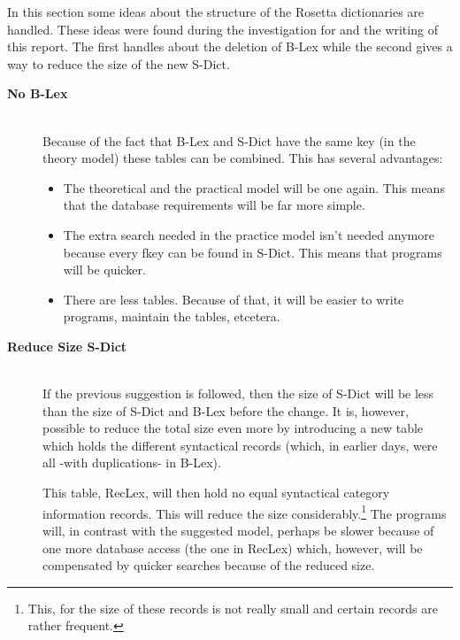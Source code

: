 In this section some ideas about the structure of the Rosetta dictionaries 
are handled. These ideas were found during the investigation for and the writing
of this report. The first handles about the deletion of B-Lex while the second 
gives a way to reduce the size of the new S-Dict.

\begin{description}
  \item [{\bf No B-Lex}]\hspace{1cm}\\
        Because of the fact that B-Lex and S-Dict have the same key (in the
        theory model) these tables can be combined. This has several advantages:

        \begin{itemize}
            \item The theoretical and the practical model will be one again.
                  This means that the database requirements will be far more 
                  simple.
            \item The extra search needed in the practice model isn't needed 
                  anymore because every fkey can be found in S-Dict. This
                  means that programs will be quicker.
            \item There are less tables. Because of that, it will be easier to
                  write programs, maintain the tables, etcetera.
        \end{itemize}

  \item [{\bf Reduce Size S-Dict}]\hspace{1cm}\\
        If the previous suggestion is followed, then the size of S-Dict will
        be less than the size of S-Dict and B-Lex before the change. It is,
        however, possible to reduce the total size even more by introducing
        a new table which holds the different syntactical records (which, in
        earlier days, were all -with duplications- in B-Lex). 

        This table, RecLex, will then hold no
        equal syntactical category information records. This will reduce the 
        size considerably.\footnote{This, for the size of these records is not 
        really small and certain records are rather frequent.} The programs 
        will, in contrast with the suggested model, perhaps be slower because 
        of one more database access (the one in RecLex) which, however, will be 
        compensated by quicker searches because of the reduced size.


\end{description}
